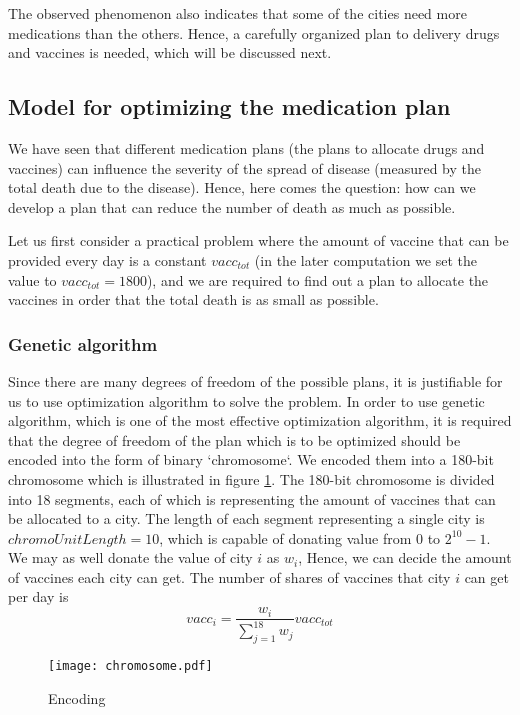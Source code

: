 The observed phenomenon also indicates that some of the cities need more medications than the others. Hence, a carefully organized plan to delivery drugs and vaccines is needed, which will be discussed next.

\subsection{Model for optimizing the medication plan}
We have seen that different medication plans (the plans to allocate drugs and vaccines) can influence the severity of the spread of disease (measured by the total death due to the disease). Hence, here comes the question: how can we develop a plan that can reduce the number of death as much as possible.

Let us first consider a practical problem where the amount of vaccine that can be provided every day is a constant $vacc_{tot}$ (in the later computation we set the value to $vacc_{tot} = 1800$), and we are required to find out a plan to allocate the vaccines in order that the total death is as small as possible.
\subsubsection{Genetic algorithm}
Since there are many degrees of freedom of the possible plans, it is justifiable for us to use optimization algorithm to solve the problem. In order to use genetic algorithm, which is one of the most effective optimization algorithm, it is required that the degree of freedom of the plan which is to be optimized should be encoded into the form of binary `chromosome`. We encoded them into a 180-bit chromosome which is illustrated in figure \ref{chromosome}. The 180-bit chromosome is divided into 18 segments, each of which is representing the amount of vaccines that can be allocated to a city. The length of each segment representing a single city is $chromoUnitLength=10$, which is capable of donating value from 0 to $2^{10}-1$. We may as well donate the value of city $i$ as $w_i$, Hence, we can decide the amount of vaccines each city can get. The number of shares of vaccines that city $i$ can get per day is 
\begin{equation}
vacc_i = \dfrac{w_i}{\sum_{j=1}^{18} w_j} vacc_{tot}
\end{equation}

\begin{figure}
\centering
\texttt{[image: chromosome.pdf]}
\caption{Encoding}
\label{chromosome}
\end{figure}

